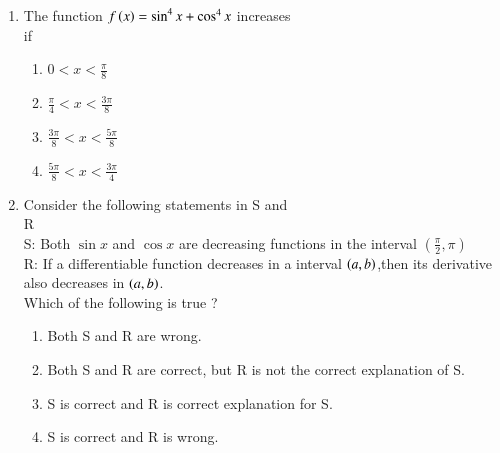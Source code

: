 \documentclass[journal,12pt,twocolumn]{IEEEtran}
\theoremstyle{remark}
\begin{document}
\begin{enumerate}[start=9]
\item The function $f\left(x\right)= \sin^4{x}+\cos^4{x}$ increases \\
	if \hfill {}
\begin{enumerate}
    \item $0<x<\displaystyle\frac{\pi}{8}$\\
    \item $\displaystyle\frac{\pi}{4}<x<\displaystyle\frac{3\pi}{8}$\\
    \item $\displaystyle\frac{3\pi}{8} <x<\displaystyle\frac{5\pi}{8}$\\
    \item $\displaystyle\frac{5\pi}{8}<x<\displaystyle\frac{3\pi}{4}$\\
\end{enumerate}
\item Consider the following statements in S and \\
R \hfill {}\\
S: Both $\sin{x}$ and $\cos{x}$ are decreasing functions in the interval $\left(\displaystyle\frac{\pi}{2},\pi\right)$\\
R: If a differentiable function decreases in a interval $\left(a,b\right)$,then its derivative also decreases in $\left(a,b\right)$.\\
Which of the following is true ?
\begin{enumerate}
    \item Both S and R are wrong.
    \item Both S and R are correct, but R is not the correct explanation of S.
    \item S is correct and R is correct explanation for S.
    \item S is correct and R is wrong.\\
\end{enumerate}


\end{enumerate}
\end{document}
